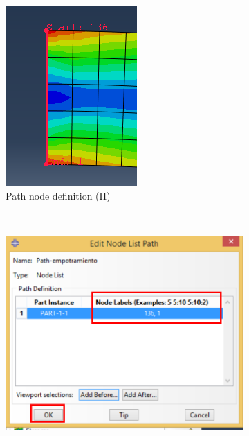 \begin{enumerate}
\begin{figure}[H]
\begin{subfigure}{0.30\textwidth}
     \includegraphics[width=\textwidth]{./body/images/imagen102}
     \caption{Path node definition (II)}
     \label{figu102}
   \end{subfigure}%
   ~ %
   \begin{subfigure}{0.39\textwidth}
     \includegraphics[width=\textwidth]{./body/images/imagen103.pdf}

\end{subfigure}
\end{figure}
\end{enumerate}
